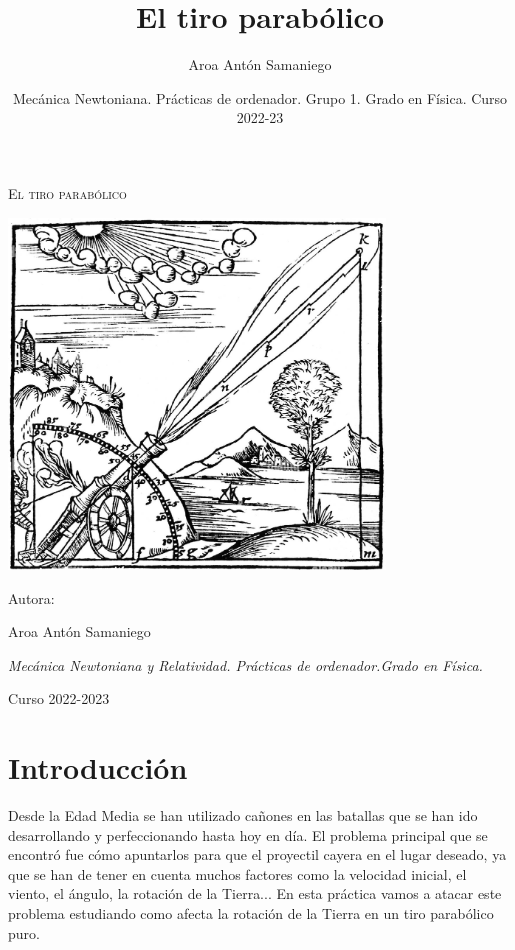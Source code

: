 \documentclass{article}
\title{\textbf{El tiro parabólico}}
\date{Mecánica Newtoniana. Prácticas de ordenador. Grupo 1. Grado en Física. Curso 2022-23}
\author{Aroa Antón Samaniego}
\begin{document}


\begin{titlepage}
\centering
{\itshape\Large \par}
\vspace{3cm}
{\scshape\Huge El tiro parabólico \par}
\vspace{3cm}
{\includegraphics[width=0.75\textwidth]{lanzamiento.png}\par}
\vfill
{\Large Autora: \par}
{\Large Aroa Antón Samaniego \par}
\vfill
{\itshape\Large Mecánica Newtoniana y Relatividad. Prácticas de ordenador.Grado en Física. \par}
{\Large Curso 2022-2023 \par}
\end{titlepage}
    \tableofcontents\hspace{5cm}\pagebreak
\section{Introducción}
Desde la Edad Media se han utilizado cañones en las batallas que se han ido desarrollando y perfeccionando hasta hoy en día. El problema principal que se encontró fue cómo apuntarlos para que el proyectil cayera en el lugar deseado, ya que se han de tener en cuenta muchos factores como la velocidad inicial, el viento, el ángulo, la rotación de la Tierra...\newline\linebreak
En esta práctica vamos a atacar este problema estudiando como afecta la rotación de la Tierra en un tiro parabólico puro.
\end{document}
